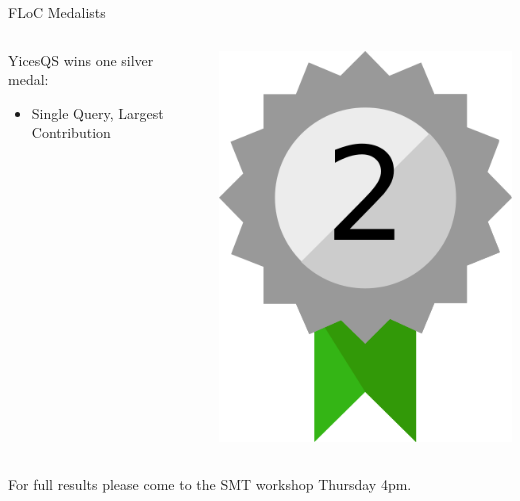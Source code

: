 \documentclass[table]{beamer}
\newcommand\vitem{\vfill\item}
\begin{document}
\begin{frame}{FLoC Medalists}

  \begin{columns}
    \begin{column}{0.6\textwidth}

  \Large YicesQS wins one silver medal:
  \begin{itemize}
    \bigskip
    \vitem Single Query, Largest Contribution
  \end{itemize}
\end{column}
\hfill
\begin{column}{0.4\textwidth}
  \begin{center}
    \includegraphics[width=.3\textwidth]{medalsilver}
  \end{center}
\end{column}
\end{columns}

\end{frame}

\begin{frame}

  \begin{center}
    \Large For full results please come to the SMT workshop Thursday 4pm.
  \end{center}

\end{frame}
\end{document}
